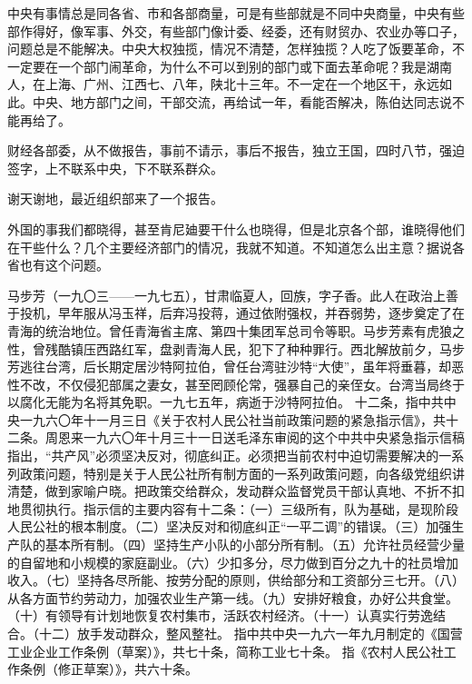 中央有事情总是同各省、市和各部商量，可是有些部就是不同中央商量，中央有些部作得好，像军事、外交，有些部门像计委、经委，还有财贸办、农业办等口子，问题总是不能解决。中央大权独揽，情况不清楚，怎样独揽？人吃了饭要革命，不一定要在一个部门闹革命，为什么不可以到别的部门或下面去革命呢？我是湖南人，在上海、广州、江西七、八年，陕北十三年。不一定在一个地区干，永远如此。中央、地方部门之间，干部交流，再给试一年，看能否解决，陈伯达同志说不能再给了。

财经各部委，从不做报告，事前不请示，事后不报告，独立王国，四时八节，强迫签字，上不联系中央，下不联系群众。

谢天谢地，最近组织部来了一个报告。

外国的事我们都晓得，甚至肯尼廸要干什么也晓得，但是北京各个部，谁晓得他们在干些什么？几个主要经济部门的情况，我就不知道。不知道怎么出主意？据说各省也有这个问题。

\begin{maonote}
马步芳（一九〇三——一九七五），甘肃临夏人，回族，字子香。此人在政治上善于投机，早年服从冯玉祥，后弃冯投蒋，通过依附强权，并吞弱势，逐步奠定了在青海的统治地位。曾任青海省主席、第四十集团军总司令等职。马步芳素有虎狼之性，曾残酷镇压西路红军，盘剥青海人民，犯下了种种罪行。西北解放前夕，马步芳逃往台湾，后长期定居沙特阿拉伯，曾任台湾驻沙特“大使”，虽年将垂暮，却恶性不改，不仅侵犯部属之妻女，甚至罔顾伦常，强暴自己的亲侄女。台湾当局终于以腐化无能为名将其免职。一九七五年，病逝于沙特阿拉伯。
十二条，指中共中央一九六〇年十一月三日《关于农村人民公社当前政策问题的紧急指示信》，共十二条。周恩来一九六〇年十月三十一日送毛泽东审阅的这个中共中央紧急指示信稿指出，“共产风”必须坚决反对，彻底纠正。必须把当前农村中迫切需要解决的一系列政策问题，特别是关于人民公社所有制方面的一系列政策问题，向各级党组织讲清楚，做到家喻户晓。把政策交给群众，发动群众监督党员干部认真地、不折不扣地贯彻执行。指示信的主要内容有十二条：（一）三级所有，队为基础，是现阶段人民公社的根本制度。（二）坚决反对和彻底纠正“一平二调”的错误。（三）加强生产队的基本所有制。（四）坚持生产小队的小部分所有制。（五）允许社员经营少量的自留地和小规模的家庭副业。（六）少扣多分，尽力做到百分之九十的社员增加收入。（七）坚持各尽所能、按劳分配的原则，供给部分和工资部分三七开。（八）从各方面节约劳动力，加强农业生产第一线。（九）安排好粮食，办好公共食堂。（十）有领导有计划地恢复农村集市，活跃农村经济。（十一）认真实行劳逸结合。（十二）放手发动群众，整风整社。
指中共中央一九六一年九月制定的《国营工业企业工作条例（草案）》，共七十条，简称工业七十条。
指《农村人民公社工作条例（修正草案）》，共六十条。
\end{maonote}
